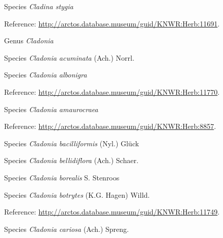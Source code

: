 \documentclass[9pt, article]{memoir}
\begin{document}
\begin{multicols}{2}
\vspace{6pt}\noindent\hspace{36pt}Species \textit{Cladina stygia}


\vspace{6pt}Reference: 
\url{http://arctos.database.museum/guid/KNWR:Herb:11691}.

\vspace{6pt}\noindent\hspace{30pt}Genus \textit{Cladonia}


\vspace{6pt}\noindent\hspace{36pt}Species \textit{Cladonia acuminata} (Ach.) Norrl.


\vspace{6pt}\noindent\hspace{36pt}Species \textit{Cladonia albonigra}


\vspace{6pt}Reference: 
\url{http://arctos.database.museum/guid/KNWR:Herb:11770}.

\vspace{6pt}\noindent\hspace{36pt}Species \textit{Cladonia amaurocraea}


\vspace{6pt}Reference: 
\url{http://arctos.database.museum/guid/KNWR:Herb:8857}.

\vspace{6pt}\noindent\hspace{36pt}Species \textit{Cladonia bacilliformis} (Nyl.) Glück


\vspace{6pt}\noindent\hspace{36pt}Species \textit{Cladonia bellidiflora} (Ach.) Schaer.


\vspace{6pt}\noindent\hspace{36pt}Species \textit{Cladonia borealis} S. Stenroos


\vspace{6pt}\noindent\hspace{36pt}Species \textit{Cladonia botrytes} (K.G. Hagen) Willd.


\vspace{6pt}Reference: 
\url{http://arctos.database.museum/guid/KNWR:Herb:11749}.

\vspace{6pt}\noindent\hspace{36pt}Species \textit{Cladonia cariosa} (Ach.) Spreng.



\end{multicols}
\end{document}

